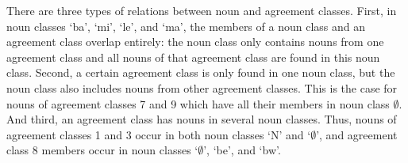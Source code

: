There are three types of relations between noun and agreement classes. First, in noun classes `ba', `mi', `le', and `ma', the members of a noun class and an agreement class overlap entirely: the noun class only contains nouns from one agreement class and all nouns of that agreement class are found in this noun class. Second, a certain agreement class is only found in one noun class, but the noun class also includes nouns from other agreement classes. This is the case for nouns of agreement classes 7 and 9 which have all their members in noun class $\emptyset$. And third, an agreement class has nouns in several noun classes.  Thus, nouns of agreement classes 1 and 3 occur in both noun classes `N' and `$\emptyset$', and agreement class 8 members occur in noun classes `$\emptyset$', `be', and `bw'.





